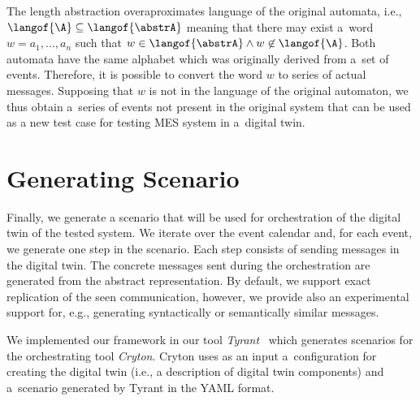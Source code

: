 {The length abstraction overaproximates language of the original automata, i.e.,
$\langof{\A}\subseteq\langof{\abstrA}$ meaning that there may exist a~word
$w=a_1,\ldots,a_n$ such that $w\in\langof{\abstrA} \wedge w\not\in\langof{\A}$.
Both automata have the same alphabet which was originally derived from a~set of
events.  Therefore, it is possible to convert the word $w$ to series of actual
messages.  Supposing that $w$ is not in the language of the original automaton,
we thus obtain a~series of events not present in the original system that can
be used as a new test case for testing MES system in a~digital twin.

\section{Generating Scenario}
\label{sec:scenario}

Finally, we generate a scenario that will be used for orchestration of the
digital twin of the tested system.
%
We iterate over the event calendar and, for each event, we generate one step in
the scenario.
%
Each step consists of sending messages in the digital twin.
%
The concrete messages sent during the orchestration are generated from the
abstract representation.
%
By default, we support exact replication of the seen communication, however, we
provide also an experimental support for, e.g., generating syntactically or
semantically similar messages.

We implemented our framework in our tool \emph{Tyrant}~\cite{ref_tyrant} which
generates scenarios for the orchestrating tool \emph{Cryton}.
%
Cryton uses as an input a~configuration for creating the digital twin (i.e., a
description of digital twin components) and a~scenario generated by Tyrant in
the YAML format.
%

}
